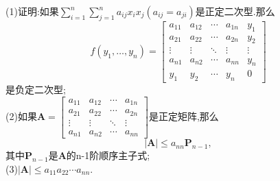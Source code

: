 \documentclass[lang=cn,11pt,normal]{elegantbook}
\begin{document}
	\begin{exercise}
		(1)证明:如果${\displaystyle \sum^n_{i=1}\sum^n_{j=1}}a_{ij}x_ix_j(a_{ij}=a_{ji})$是正定二次型.那么
		$$
		f(y_1,\dots,y_n)=
		\begin{bmatrix}
		a_{11}&a_{12}&\cdots&a_{1n}&y_1\\
		a_{21}&a_{22}&\cdots&a_{2n}&y_2\\
		\vdots&\vdots&\ddots&\vdots&\vdots\\
		a_{n1}&a_{n2}&\cdots&a_{nn}&y_n\\
		y_1&y_2&\cdots&y_n&0
		\end{bmatrix}
		$$
		是负定二次型;\\
		(2)如果$\boldsymbol{A}=
		\begin{bmatrix}
		a_{11}&a_{12}&\cdots&a_{1n}\\
		a_{21}&a_{22}&\cdots&a_{2n}\\
		\vdots&\vdots&\ddots&\vdots\\
		a_{n1}&a_{n2}&\cdots&a_{nn}
		\end{bmatrix}
		$是正定矩阵,那么
		$$
		|\boldsymbol{A}|\leq a_{nn}\boldsymbol{P}_{n-1},
		$$
		其中$\boldsymbol{P}_{n-1}$是$\boldsymbol{A}$的n-1阶顺序主子式;\\
		(3)$|\boldsymbol{A}|\leq a_{11}a_{22}\cdots a_{nn}.$
	\end{exercise}
\end{document}
